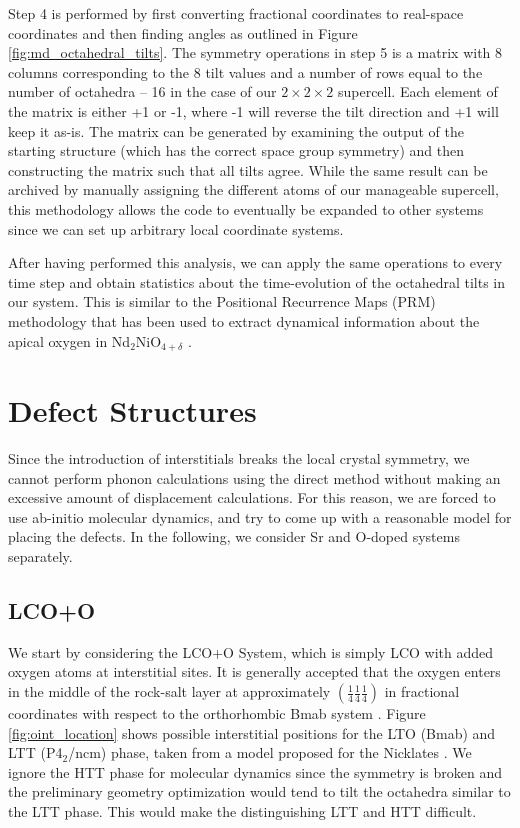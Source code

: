 \noindent Step 4 is performed by first converting fractional coordinates to real-space coordinates and then finding angles as outlined in Figure \ref{fig:md_octahedral_tilts}. The symmetry operations in step 5 is a matrix with 8 columns corresponding to the 8 tilt values and a number of rows equal to the number of octahedra -- 16 in the case of our $2 \times 2 \times 2$ supercell. Each element of the matrix is either +1 or -1, where -1 will reverse the tilt direction and +1 will keep it as-is. The matrix can be generated by examining the output of the starting structure (which has the correct space group symmetry) and then constructing the matrix such that all tilts agree. While the same result can be archived by manually assigning the different atoms of our manageable supercell, this methodology allows the code to eventually be expanded to other systems since we can set up arbitrary local coordinate systems.

After having performed this analysis, we can apply the same operations to every time step and obtain statistics about the time-evolution of the octahedral tilts in our system. This is similar to the Positional Recurrence Maps (PRM) methodology \cite{Piovano2016} that has been used to extract dynamical information about the apical oxygen in Nd$_2$NiO$_{4+\delta}$ \cite{Perrichon2015}.

\section{Defect Structures}
Since the introduction of interstitials breaks the local crystal symmetry, we cannot perform phonon calculations using the direct method without making an excessive amount of displacement calculations. For this reason, we are forced to use ab-initio molecular dynamics, and try to come up with a reasonable model for placing the defects. In the following, we consider Sr and O-doped systems separately.

\subsection{LCO+O}
We start by considering the LCO+O System, which is simply LCO with added oxygen atoms at interstitial sites. It is generally accepted that the oxygen enters in the middle of the rock-salt layer at approximately $\left(\frac{1}{4}  \frac{1}{4} \frac{1}{4} \right)$ in fractional coordinates with respect to the orthorhombic Bmab system \cite{Rial1997}. Figure \ref{fig:oint_location} shows possible interstitial positions for the LTO (Bmab) and LTT (P4$_2$/ncm) phase, taken from a model proposed for the Nicklates \cite{Tranquada1994}. We ignore the HTT phase for molecular dynamics since the symmetry is broken and the preliminary geometry optimization would tend to tilt the octahedra similar to the LTT phase. This would make the distinguishing LTT and HTT difficult.

